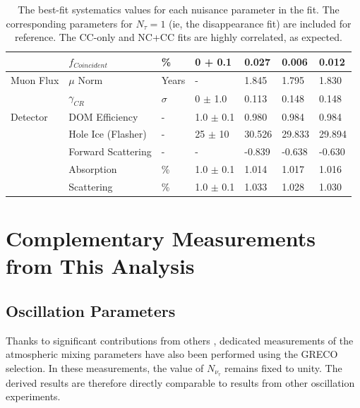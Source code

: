 \begin{landscape}
\begin{table}[]
{\begin{tabular}{@{}lllllll@{}}
                                & $f_{Coincident}$        & \%            & 0 + 0.1            & 0.027           & 0.006          & 0.012         \\ \midrule
Muon Flux                  & $\mu$ Norm              & Years        & -                      & 1.845           & 1.795          & 1.830         \\
                                & $\gamma_{CR}$       & $\sigma$  & 0 $\pm$ 1.0    & 0.113          & 0.148          & 0.148         \\ \midrule
Detector                   & DOM Efficiency            & -               & 1.0 $\pm$ 0.1 & 0.980          & 0.984          & 0.984         \\
                                & Hole Ice (Flasher)        & -               & 25 $\pm$ 10   & 30.526        & 29.833         & 29.894        \\
                                & Forward Scattering      & -               & -                      & -0.839         & -0.638         & -0.630        \\
                                & Absorption                  & \%           & 1.0 $\pm$ 0.1  & 1.014          & 1.017          & 1.016         \\
                                & Scattering                   & \%           & 1.0 $\pm$ 0.1   & 1.033         & 1.028          & 1.030         \\ \bottomrule
\end{tabular}%
}
\caption{The best-fit systematics values for each nuisance parameter in the fit. The corresponding parameters for $N_\tau=1$ (ie, the disappearance fit) are included for reference. The CC-only and NC+CC fits are highly correlated, as expected. }
\label{tab:bestfit_systematics}
\end{table}
\end{landscape}





\label{section:other_measurements}
\section{Complementary Measurements from This Analysis}

\label{subsec:oscil_results}
\subsection{Oscillation Parameters}
Thanks to significant contributions from others , dedicated measurements of the atmospheric mixing parameters have also been performed using the GRECO selection.
In these measurements, the value of ${N_{\nu_\tau}}$ remains fixed to unity.
The derived results are therefore directly comparable to results from other oscillation experiments.

